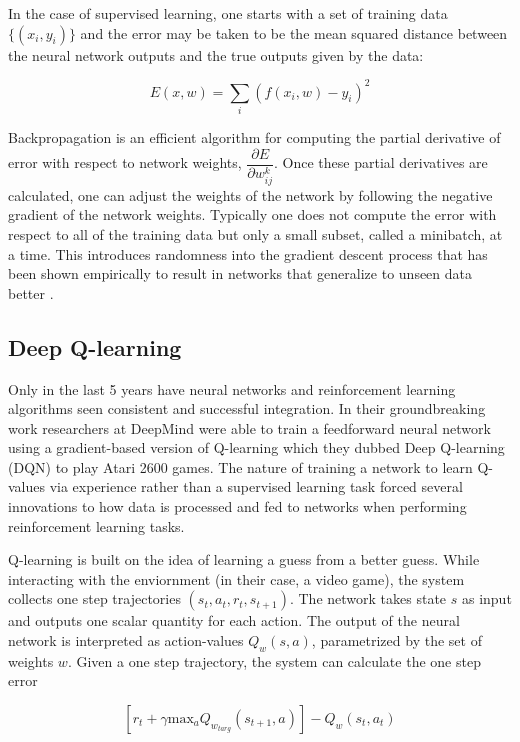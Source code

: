 In the case of supervised learning, one starts with a set of training data $\{(x_i, y_i)\}$ and the error may be taken to be the mean squared distance between the neural network outputs and the true outputs given by the data:

\begin{equation}
    E(x, w) = \sum_{i} (f(x_i, w) - y_i)^2
\label{eq:MSE}
\end{equation}

Backpropagation \cite{rumelhart1988learning} is an efficient algorithm for computing the partial derivative of error with respect to network weights, $\dfrac{\partial E}{\partial w_{ij}^k}$. Once these partial derivatives are calculated, one can adjust the weights of the network by following the negative gradient of the network weights. Typically one does not compute the error with respect to all of the training data but only a small subset, called a minibatch, at a time. This introduces randomness into the gradient descent process that has been shown empirically to result in networks that generalize to unseen data better \cite{jastrzkebski2018finding, poggio2017theory}.


\subsection{Deep Q-learning}

Only in the last 5 years have neural networks and reinforcement learning algorithms seen consistent and successful integration. In their groundbreaking work \cite{mnih2015human} researchers at DeepMind were able to train a feedforward neural network using a gradient-based version of Q-learning which they dubbed Deep Q-learning (DQN) to play Atari 2600 games. The nature of training a network to learn Q-values via experience rather than a supervised learning task forced several innovations to how data is processed and fed to networks when performing reinforcement learning tasks. 

Q-learning is built on the idea of learning a guess from a better guess. While interacting with the enviornment (in their case, a video game), the system collects one step trajectories $(s_t, a_t, r_t, s_{t+1})$. The network takes state $s$ as input and outputs one scalar quantity for each action. The output of the neural network is interpreted as action-values $Q_{w}(s,a)$, parametrized by the set of weights $w$. Given a one step trajectory, the system can calculate the one step error

\begin{equation}
    \left[r_t + \gamma \text{max}_a Q_{w_{targ}}(s_{t+1}, a)\right] - Q_{w}(s_t, a_t)
\end{equation}

